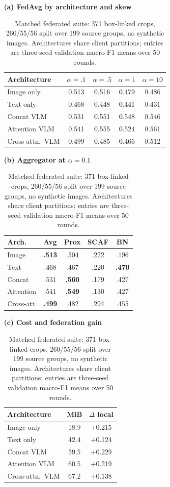 \documentclass[conference]{IEEEtran}
\begin{document}
\begin{table}[t]
\caption{Matched federated suite: 371 box-linked crops, 260/55/56 split over 199 source groups, no synthetic images. Architectures share client partitions; entries are three-seed validation macro-F1 means over 50 rounds.}
\label{tab:standard_suite}
\centering\scriptsize
\setlength\tabcolsep{2.7pt}
\begin{minipage}[t]{0.38\textwidth}
\centering
\textbf{(a) FedAvg by architecture and skew}
\begin{tabular}{lcccc}
\toprule
Architecture & $\alpha{=}.1$ & $\alpha{=}.5$ & $\alpha{=}1$ & $\alpha{=}10$\\
\midrule
Image only        & 0.513 & 0.516 & 0.479 & 0.486\\
Text only         & 0.468 & 0.448 & 0.441 & 0.431\\
Concat VLM        & 0.531 & 0.551 & 0.548 & 0.546\\
Attention VLM     & 0.541 & 0.555 & 0.524 & 0.561\\
Cross-attn.\ VLM  & 0.499 & 0.485 & 0.466 & 0.512\\
\bottomrule
\end{tabular}
\end{minipage}\hfill
\begin{minipage}[t]{0.30\textwidth}
\centering
\textbf{(b) Aggregator at $\alpha{=}0.1$}
\begin{tabular}{lcccc}
\toprule
Arch. & Avg & Prox & SCAF & BN\\
\midrule
Image      & \textbf{.513} & .504 & .222 & .196\\
Text       & .468 & .467 & .220 & \textbf{.470}\\
Concat     & .531 & \textbf{.560} & .179 & .427\\
Attention  & .541 & \textbf{.549} & .130 & .427\\
Cross-att  & \textbf{.499} & .482 & .294 & .455\\
\bottomrule
\end{tabular}
\end{minipage}\hfill
\begin{minipage}[t]{0.28\textwidth}
\centering
\textbf{(c) Cost and federation gain}
\begin{tabular}{lcc}
\toprule
Architecture & MiB & $\Delta$ local\\
\midrule
Image only        & 18.9 & $+$0.215\\
Text only         & 42.4 & $+$0.124\\
Concat VLM        & 59.5 & $+$0.229\\
Attention VLM     & 60.5 & $+$0.219\\
Cross-attn.\ VLM  & 67.2 & $+$0.138\\
\bottomrule
\end{tabular}
\end{minipage}
\end{table}
\end{document}
